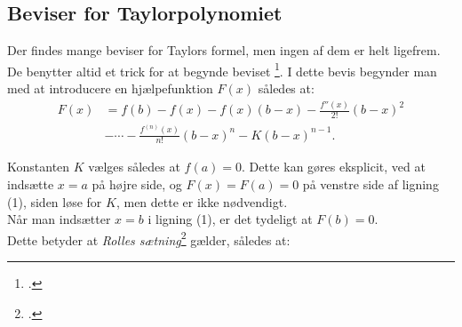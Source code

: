 \documentclass[12pt, a4paper]{article}
\begin{document}
\begin{refsection}
\subsection{Beviser for Taylorpolynomiet}


Der findes mange beviser for Taylors formel, men ingen af dem er helt ligefrem. De benytter altid et trick for at begynde beviset \footcite[A-44]{calculuswithanalyticgeometry}. I dette bevis begynder man med at introducere en hjælpefunktion $F(x)$ således at:
\begin{equation}
 \begin{aligned}
     F(x)&=f(b)-f(x)-f(x)(b-x)-\frac{f''(x)}{2!}(b-x)^2\\
         &- \cdots -\frac{f^{(n)}(x)}{n!}(b-x)^n-K(b-x)^{n-1}.
\end{aligned}
\end{equation}


\begin{savenotes}
\noindent%
\begin{minipage}{0.6\textwidth}
Konstanten $K$ vælges således at $f(a)=0$. Dette kan gøres eksplicit, ved at indsætte $x=a$ på højre side, og $F(x)=F(a)=0$ på venstre side af ligning (1), siden løse for $K$, men dette er ikke nødvendigt.\\
Når man indsætter $x=b$ i ligning (1), er det tydeligt at  $F(b)=0$.\\
Dette betyder at \textit{Rolles sætning}\footcite[s. 210]{calculuswithanalyticgeometry} gælder, således at:
\end{minipage}
\begin{minipage}{0.4\textwidth}
\begin{center}
\end{center}
\end{minipage}
\end{savenotes}




\end{refsection}
\end{document}
